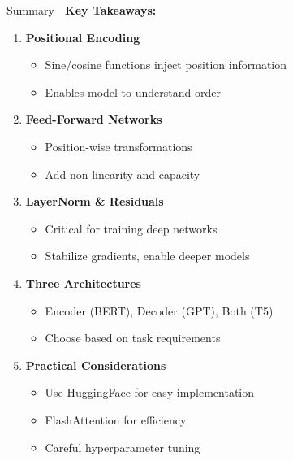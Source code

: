 \documentclass[aspectratio=169]{beamer}
\begin{document}
\begin{frame}[shrink=10]{Summary 🎯}
\textbf{Key Takeaways:}

\vspace{1em}

\begin{enumerate}\setlength{\itemsep}{0pt}
    \item \textbf{Positional Encoding}
    \begin{itemize}\setlength{\itemsep}{0pt}
        \item Sine/cosine functions inject position information
        \item Enables model to understand order
    \end{itemize}

    \item \textbf{Feed-Forward Networks}
    \begin{itemize}\setlength{\itemsep}{0pt}
        \item Position-wise transformations
        \item Add non-linearity and capacity
    \end{itemize}

    \item \textbf{LayerNorm \& Residuals}
    \begin{itemize}\setlength{\itemsep}{0pt}
        \item Critical for training deep networks
        \item Stabilize gradients, enable deeper models
    \end{itemize}

    \item \textbf{Three Architectures}
    \begin{itemize}\setlength{\itemsep}{0pt}
        \item Encoder (BERT), Decoder (GPT), Both (T5)
        \item Choose based on task requirements
    \end{itemize}

    \item \textbf{Practical Considerations}
    \begin{itemize}\setlength{\itemsep}{0pt}
        \item Use HuggingFace for easy implementation
        \item FlashAttention for efficiency
        \item Careful hyperparameter tuning
    \end{itemize}
\end{enumerate}
\end{frame}
\end{document}
